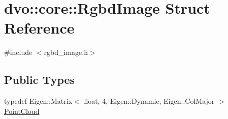 \hypertarget{structdvo_1_1core_1_1_rgbd_image}{}\section{dvo\+:\+:core\+:\+:Rgbd\+Image Struct Reference}
\label{structdvo_1_1core_1_1_rgbd_image}


{\ttfamily \#include $<$rgbd\+\_\+image.\+h$>$}

\subsection*{Public Types}
\begin{DoxyCompactItemize}
\item 
typedef Eigen\+::\+Matrix$<$ float, 4, Eigen\+::\+Dynamic, Eigen\+::\+Col\+Major $>$ \mbox{\hyperlink{structdvo_1_1core_1_1_rgbd_image_a56820965eb98427d06e6733fe333cdc5}{Point\+Cloud}}
\end{DoxyCompactItemize}
